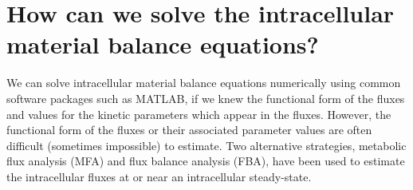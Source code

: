 \documentclass[11pt]{article}
\theoremstyle{definition}
\begin{document}
\setcounter{page}{1}




\section{How can we solve the intracellular material balance equations?}
We can solve intracellular material balance equations numerically using common software packages such as MATLAB,
if we knew the functional form of the fluxes and values for the kinetic parameters which appear in the fluxes.
However, the functional form of the fluxes or their associated parameter values are often difficult (sometimes impossible) to estimate.
Two alternative strategies, metabolic flux analysis (MFA) and flux balance analysis (FBA), have been used to estimate the intracellular fluxes at or near an intracellular
steady-state.
\end{document}
